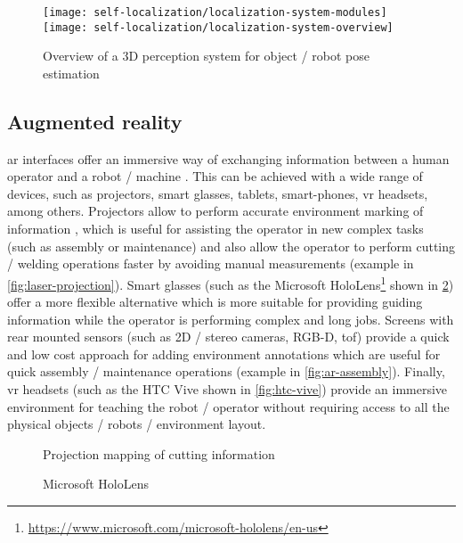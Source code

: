 \begin{figure}[H]
	\centering
	\texttt{[image: self-localization/localization-system-modules]}
	\texttt{[image: self-localization/localization-system-overview]}
	\caption[Overview of a 3D perception system for object / robot pose estimation]{Overview of a 3D perception system for object / robot pose estimation \cite{Costa2016Elsevier}}
	\label{fig:localization-system}
\end{figure}



\subsection{Augmented reality}

\gls{ar} interfaces \cite{Bimber2005} offer an immersive way of exchanging information between a human operator and a robot / machine \cite{Kollatsch2014,Gaschler2014,Dini2015,Michalos2016}. This can be achieved with a wide range of devices, such as projectors, smart glasses, tablets, smart-phones, \gls{vr} headsets, among others. Projectors allow to perform accurate environment marking of information \cite{Tan2013,Fujimoto2014}, which is useful for assisting the operator in new complex tasks (such as assembly or maintenance) and also allow the operator to perform cutting / welding operations faster by avoiding manual measurements (example in \cref{fig:laser-projection}). Smart glasses (such as the Microsoft HoloLens\footnote{\url{https://www.microsoft.com/microsoft-hololens/en-us}} shown in \cref{fig:hololens}) offer a more flexible alternative which is more suitable for providing guiding information while the operator is performing complex and long jobs. Screens with rear mounted sensors (such as 2D / stereo cameras, RGB-D, \gls{tof}) provide a quick and low cost approach for adding environment annotations which are useful for quick assembly / maintenance operations (example in \cref{fig:ar-assembly}). Finally, \gls{vr} headsets (such as the HTC Vive shown in \cref{fig:htc-vive}) provide an immersive environment for teaching the robot / operator without requiring access to all the physical objects / robots / environment layout.

\begin{figure}[H]
	\begin{floatrow}[2]
		{\caption[Projection mapping of cutting information]{Projection mapping of cutting information\protect\footnotemark}\label{fig:laser-projection}}
		{\caption[Microsoft HoloLens]{Microsoft HoloLens\protect\footnotemark}\label{fig:hololens}}
	\end{floatrow}
\end{figure}


